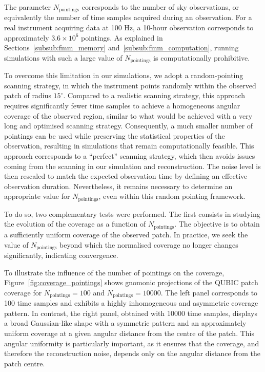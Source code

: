 \documentclass[../../thesis.tex]{subfiles}
\begin{document}
The parameter $N_{\text{pointings}}$ corresponds to the number of sky observations, or equivalently the number of time samples acquired during an observation. For a real instrument acquiring data at 100 Hz, a 10-hour observation corresponds to approximately $3.6\times10^6$ pointings. As explained in Sections~\ref{subsub:fmm_memory} and~\ref{subsub:fmm_computation}, running simulations with such a large value of $N_{\text{pointings}}$ is computationally prohibitive.

To overcome this limitation in our simulations, we adopt a random-pointing scanning strategy, in which the instrument points randomly within the observed patch of radius $15^\circ$. Compared to a realistic scanning strategy, this approach requires significantly fewer time samples to achieve a homogeneous angular coverage of the observed region, similar to what would be achieved with a very long and optimised scanning strategy. Consequently, a much smaller number of pointings can be used while preserving the statistical properties of the observation, resulting in simulations that remain computationally feasible. This approach corresponds to a \enquote{perfect} scanning strategy, which then avoids issues coming from the scanning in our simulation and reconstruction. The noise level is then rescaled to match the expected observation time by defining an effective observation duration. Nevertheless, it remains necessary to determine an appropriate value for $N_{\text{pointings}}$, even within this random pointing framework.

To do so, two complementary tests were performed. The first consists in studying the evolution of the coverage as a function of $N_{\text{pointings}}$. The objective is to obtain a sufficiently uniform coverage of the observed patch. In practice, we seek the value of $N_{\text{pointings}}$ beyond which the normalised coverage no longer changes significantly, indicating convergence.

To illustrate the influence of the number of pointings on the coverage, Figure~\ref{fig:coverage_pointings} shows gnomonic projections of the QUBIC patch coverage for $N_{\text{pointings}}=100$ and $N_{\text{pointings}}=10000$. The left panel corresponds to 100 time samples and exhibits a highly inhomogeneous and asymmetric coverage pattern. In contrast, the right panel, obtained with 10000 time samples, displays a broad Gaussian-like shape with a symmetric pattern and an approximately uniform coverage at a given angular distance from the centre of the patch. This angular uniformity is particularly important, as it ensures that the coverage, and therefore the reconstruction noise, depends only on the angular distance from the patch centre.
\end{document}
